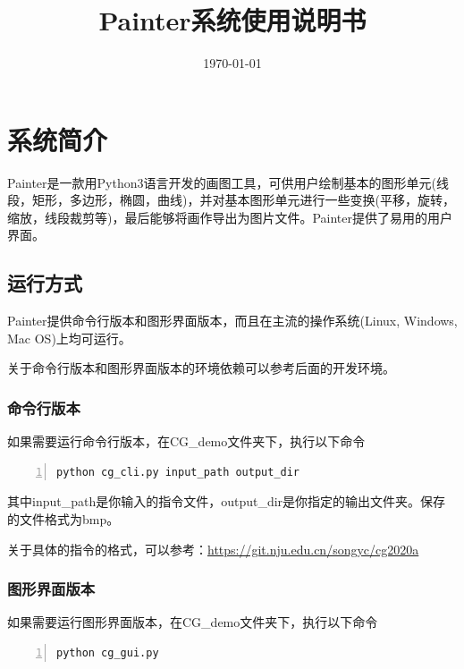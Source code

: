 \documentclass[11pt, a4paper, UTF8]{ctexart}
\title{Painter系统使用说明书}
\date{\today}     %
\begin{document}
\maketitle

\tableofcontents
\newpage

\section{系统简介}

Painter是一款用Python3语言开发的画图工具，可供用户绘制基本的图形单元(线段，矩形，多边形，椭圆，曲线)，并对基本图形单元进行一些变换(平移，旋转，缩放，线段裁剪等)，最后能够将画作导出为图片文件。Painter提供了易用的用户界面。

\subsection{运行方式}

Painter提供命令行版本和图形界面版本，而且在主流的操作系统(Linux, Windows, Mac OS)上均可运行。


关于命令行版本和图形界面版本的环境依赖可以参考后面的开发环境。

\subsubsection{命令行版本}

如果需要运行命令行版本，在CG\_demo文件夹下，执行以下命令

\begin{lstlisting}[language = bash, numbers=left, 
    numberstyle=\tiny,keywordstyle=\color{blue!70},
    commentstyle=\color{red!50!green!50!blue!50},frame=shadowbox,
    rulesepcolor=\color{red!20!green!20!blue!20},basicstyle=\ttfamily]
    python cg_cli.py input_path output_dir
\end{lstlisting}
   
    其中input\_path是你输入的指令文件，output\_dir是你指定的输出文件夹。保存的文件格式为bmp。


    关于具体的指令的格式，可以参考：\url{https://git.nju.edu.cn/songyc/cg2020a}


\subsubsection{图形界面版本}

如果需要运行图形界面版本，在CG\_demo文件夹下，执行以下命令

\begin{lstlisting}[language = bash, numbers=left, 
    numberstyle=\tiny,keywordstyle=\color{blue!70},
    commentstyle=\color{red!50!green!50!blue!50},frame=shadowbox,
    rulesepcolor=\color{red!20!green!20!blue!20},basicstyle=\ttfamily]
    python cg_gui.py
\end{lstlisting}
\end{document}
